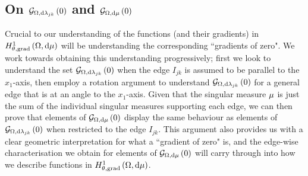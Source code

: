 \subsection{On $\mathcal{G}_{ \Omega, \mathrm{d}\lambda_{jk}}\left( 0 \right)$ and $\mathcal{G}_{ \Omega, \mathrm{d}\mu}\left( 0 \right)$} \label{ssec:GradsOfZeroTheory}
Crucial to our understanding of the functions (and their gradients) in $H^1_{\theta, \mathrm{grad}}\left( \Omega, \mathrm{d}\mu \right)$ will be understanding the corresponding ``gradients of zero".
We work towards obtaining this understanding progressively; first we look to understand the set $\mathcal{G}_{ \Omega, \mathrm{d}\lambda_{jk}}\left( 0 \right)$ when the edge $I_{jk}$ is assumed to be parallel to the $x_1$-axis, then employ a rotation argument to understand $\mathcal{G}_{ \Omega, \mathrm{d}\lambda_{jk}}\left( 0 \right)$ for a general edge that is at an angle to the $x_1$-axis.
Given that the singular measure $\mu$ is just the sum of the individual singular measures supporting each edge, we can then prove that elements of $\mathcal{G}_{ \Omega, \mathrm{d}\mu}\left( 0 \right)$ display the same behaviour as elements of $\mathcal{G}_{ \Omega, \mathrm{d}\lambda_{jk}}\left( 0 \right)$ when restricted to the edge $I_{jk}$.
This argument also provides us with a clear geometric interpretation for what a ``gradient of zero" is, and the edge-wise characterisation we obtain for elements of $\mathcal{G}_{ \Omega, \mathrm{d}\mu}\left( 0 \right)$ will carry through into how we describe functions in $H^1_{\theta, \mathrm{grad}}\left( \Omega, \mathrm{d}\mu \right)$.

